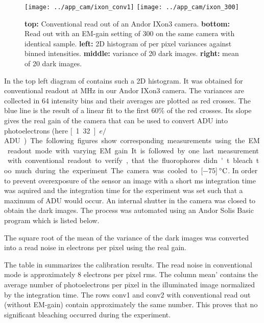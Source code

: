 \begin{figure}
  \centering
  \texttt{[image: ../app\_cam/ixon\_conv1]}
  \texttt{[image: ../app\_cam/ixon\_300]}
  \caption{{\bf top:} Conventional read out of an Andor IXon3
    camera. {\bf bottom:} Read out with an EM-gain setting of 300 on
    the same camera with identical sample. {\bf left:} 2D histogram of
    per pixel variances against binned intensities. {\bf middle:}
    variance of 20 dark images. {\bf right:} mean of 20 dark images.}
  \label{fig:ixon}
\end{figure}
  
In the top left diagram of  contains such a 2D
histogram. It was obtained for conventional readout at \unit[3]{MHz}
in our Andor IXon3 camera. The variances are collected in 64 intensity
bins and their averages are plotted as red crosses. The blue line is
the result of a linear fit to the first $60\%$ of the red crosses. Its
slope gives the real gain of the camera that can be used to convert
ADU into photoelectrons (here \unit[1.32]{$e/$ADU}).

The following figures show corresponding measurements using the EM
readout mode with varying EM gain. It is followed by one last
measurement with conventional readout to verify, that the fluorophores
didn't bleach too much during the experiment.

The camera was cooled to \unit[$-75$]{$\,^{\circ}{\rm C}$}. In order
to prevent overexposure of the sensor an image with a short
\unit[10]{ms} integration time was aquired and the integration time
for the experiment was set such that a maximum of \unit[10000]{ADU}
would occur. An internal shutter in the camera was closed to obtain
the dark images. The process was automated using an Andor Solis Basic
program which is listed below.

The square root of the mean of the variance of the dark images was
converted into a read noise in electrons per pixel using the real
gain.

The table in  summarizes the calibration
results.  The read noise in conventional mode is approximately 8
electrons per pixel rms. The column \textsf{mean'} contains the
average number of photoelectrons per pixel in the illuminated image
normalized by the integration time. The rows \textsf{conv1} and
\textsf{conv2} with conventional read out (without EM-gain) contain
approximately the same number. This proves that no significant
bleaching occurred during the experiment.

